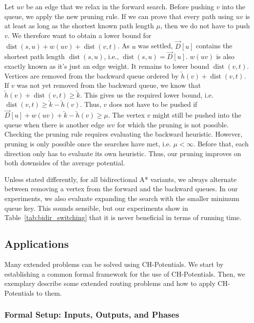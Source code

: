 \documentclass[manuscript,review]{acmart}
\newcommand*{\dist}{\operatorname{dist}}
\begin{document}
Let $uv$ be an edge that we relax in the forward search.
Before pushing $v$ into the queue, we apply the new pruning rule.
If we can prove that every path using $uv$ is at least as long as the shortest known path length $\mu$, then we do not have to push $v$.
We therefore want to obtain a lower bound for $\dist(s,u)+w(uv)+\dist(v,t)$.
As $u$ was settled, $\overrightarrow{D}[u]$ contains the shortest path length $\dist(s,u)$, i.e., $\dist(s,u)=\overrightarrow{D}[u]$.
$w(uv)$ is also exactly known as it's just an edge weight.
It remains to lower bound $\dist(v,t)$.
Vertices are removed from the backward queue ordered by $\overleftarrow{h}(v) + \dist(v,t)$.
If $v$ was not yet removed from the backward queue, we know that $\overleftarrow{h}(v) + \dist(v,t) \geq \overleftarrow{k}$.
This gives us the required lower bound, i.e. $\dist(v,t) \geq \overleftarrow{k}-\overleftarrow{h}(v)$.
Thus, $v$ does not have to be pushed if $\overrightarrow{D}[u]+w(uv)+\overleftarrow{k}-\overleftarrow{h}(v)\ge \mu$.
The vertex $v$ might still be pushed into the queue when there is another edge $wv$ for which the pruning is not possible.
Checking the pruning rule requires evaluating the backward heuristic.
However, pruning is only possible once the searches have met, i.e. $\mu < \infty$.
Before that, each direction only has to evaluate its own heuristic.
Thus, our pruning improves on both downsides of the average potential.

Unless stated differently, for all bidirectional A* variants, we always alternate between removing a vertex from the forward and the backward queues.
In our experiments, we also evaluate expanding the search with the smaller minimum queue key.
This sounds sensible, but our experiments show in Table~\ref{tab:bidir_switching} that it is never beneficial in terms of running time.

\subsection{Applications}\label{sec:extensions}

Many extended problems can be solved using CH-Potentials.
We start by establishing a common formal framework for the use of CH-Potentials.
Then, we exemplary describe some extended routing problems and how to apply CH-Potentials to them.

\subsubsection{Formal Setup: Inputs, Outputs, and Phases}
\end{document}
